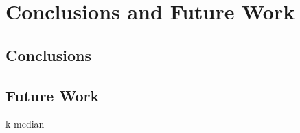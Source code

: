 \chapter{Conclusions and Future Work}\label{chapter:conclusion}


\section{Conclusions}

\section{Future Work}

k median

